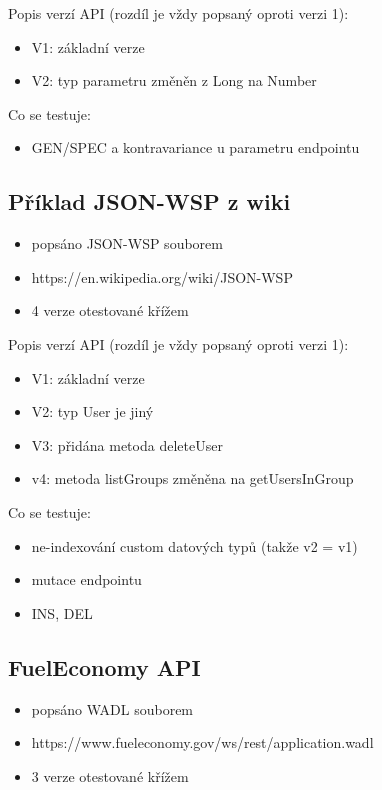 \documentclass[czech,DP]{thesiskiv}
\begin{document}
Popis verzí API (rozdíl je vždy popsaný oproti verzi 1):
\begin{itemize}
	\item V1: základní verze
	\item V2: typ parametru změněn z Long na Number
\end{itemize}

Co se testuje:
\begin{itemize}
	\item GEN/SPEC a kontravariance u parametru endpointu
\end{itemize}	
	
\subsection{Příklad JSON-WSP z wiki}

\begin{itemize}
	\item popsáno JSON-WSP souborem
	\item https://en.wikipedia.org/wiki/JSON-WSP
	\item 4 verze otestované křížem
\end{itemize}

Popis verzí API (rozdíl je vždy popsaný oproti verzi 1):
\begin{itemize}
	\item V1: základní verze
	\item V2: typ User je jiný
	\item V3: přidána metoda deleteUser
	\item v4: metoda listGroups změněna na getUsersInGroup
\end{itemize}

Co se testuje:
\begin{itemize}
	\item ne-indexování custom datových typů (takže v2 = v1)
	\item mutace endpointu
	\item INS, DEL
\end{itemize}

\subsection{FuelEconomy API}

\begin{itemize}
 \item popsáno WADL souborem
 \item https://www.fueleconomy.gov/ws/rest/application.wadl
 \item 3 verze otestované křížem
\end{itemize}
\end{document}
